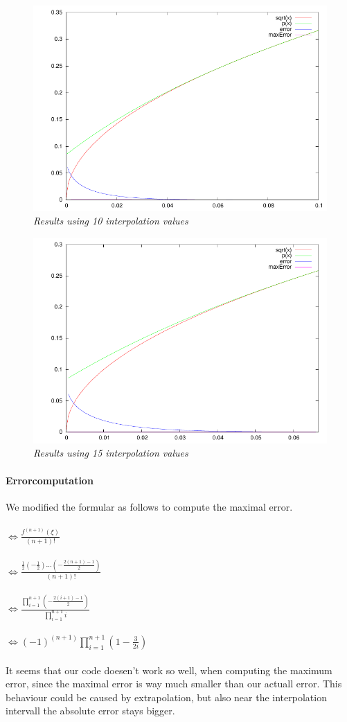 \documentclass[11pt,a4paper,notitlepage,onecolumn]{article}
\begin{document}
\begin{figure}
\centering
\includegraphics[width=\textwidth]{data/aufgabe4-1based10.pdf}
\caption{\em \small Results using 10 interpolation values}
\end{figure}

\begin{figure}
\centering
\includegraphics[width=\textwidth]{data/aufgabe4-1based15.pdf}
\caption{\em \small Results using 15 interpolation values}
\end{figure}


\paragraph{Errorcomputation} We modified the formular as follows to compute 
the maximal error. \\ \\
$\Leftrightarrow \frac{f^{(n+1)}(\xi)}{(n+1)!} $ \\ \\
$\Leftrightarrow \frac{\frac{1}{2}(-\frac{1}{2})...(-\frac{2(n+1)-1}{2})}{(n+1)!} $ \\ \\
$\Leftrightarrow \frac{\prod_{i=1}^{n+1}(-\frac{2(i+1)-1}{2})}{\prod_{i=1}^{n+1}i} $ \\ \\
$\Leftrightarrow (-1)^{(n+1)} \prod_{i=1}^{n+1}(1-\frac{3}{2i})$

\paragraph{}
It seems that our code doesen't work so well, when computing the maximum error, 
since the maximal error is way much smaller than our actuall error. This behaviour 
could be caused by extrapolation, but also near the interpolation intervall the
absolute error stays bigger.
\end{document}
